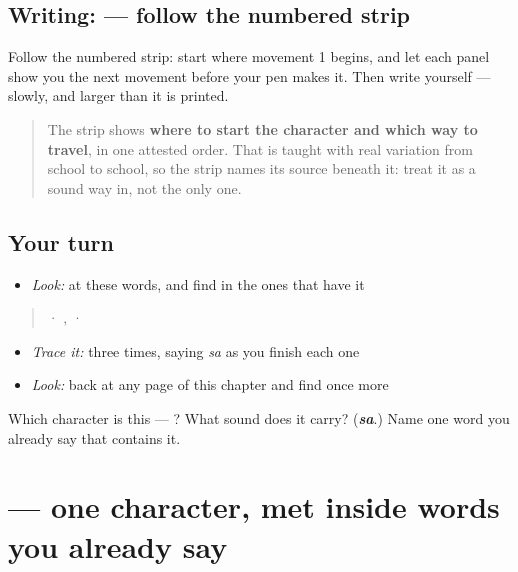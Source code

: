 \subsection*{Writing:  — follow the numbered strip}

Follow the numbered strip: start where movement 1 begins, and let each panel show you the next movement before your pen makes it. Then write  yourself — slowly, and larger than it is printed.

\begin{quote}
The strip shows \textbf{where to start the character and which way to travel}, in one attested order. That is taught with real variation from school to school, so the strip names its source beneath it: treat it as a sound way in, not the only one.
\end{quote}

\subsection*{Your turn}
\begin{itemize}
\raggedright
  \item \emph{Look:} at these words, and find  in the ones that have it
\end{itemize}

\begin{quote}
  ·  ,   ·  
\end{quote}

\begin{itemize}
\raggedright
  \item \emph{Trace it:}  three times, saying \emph{sa} as you finish each one
  \item \emph{Look:} back at any page of this chapter and find  once more
\end{itemize}

\begin{tcolorbox}[breakable,colback=teal!4,colframe=teal!35!black,title={Before you move on}]
Which character is this — ? What sound does it carry? (\emph{\textbf{sa}}.) Name one word you already say that contains it.
\end{tcolorbox}
\section[\texorpdfstring{\hi{च} (ca)}{च (ca)}]{ — one character, met inside words you already say}

